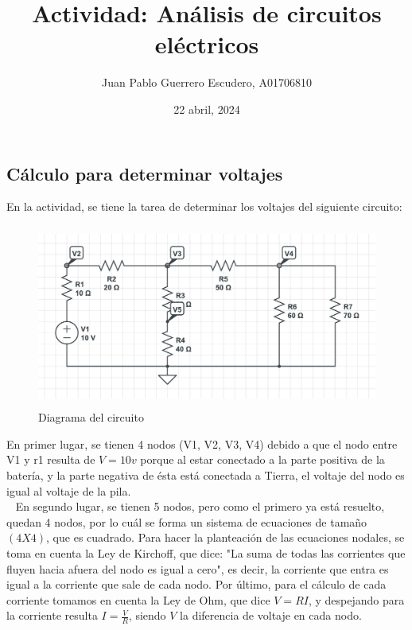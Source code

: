 \documentclass[12pt, letterpaper]{report}
\title{Actividad: Análisis de circuitos eléctricos}
\author{Juan Pablo Guerrero Escudero, A01706810}
\date{22 abril, 2024}
\begin{document}
\maketitle
\subsection*{Cálculo para determinar voltajes}
En la actividad, se tiene la tarea de determinar los voltajes del siguiente circuito: 
\begin{figure}[H]
    \centering
    \includegraphics[height = 6cm]{2024-04-22_DiagramaActividadCircuito.png}
    \caption{Diagrama del circuito}
\end{figure}
En primer lugar, se tienen 4 nodos (V1, V2, V3, V4) debido a que el nodo entre V1 y r1 resulta de $V = 10v$ porque 
al estar conectado a la parte positiva de la batería, y la parte negativa de ésta está conectada a Tierra, el voltaje del nodo 
es igual al voltaje de la pila. \\ 
En segundo lugar, se tienen 5 nodos, pero como el primero ya está resuelto, quedan 4 nodos, por lo cuál se forma un sistema de ecuaciones de tamaño 
$(4X4)$, que es cuadrado. Para hacer la planteación de las ecuaciones nodales, se toma en cuenta la Ley de Kirchoff, que dice: "La suma de todas las corrientes 
que fluyen hacia afuera del nodo es igual a cero", es decir, la corriente que entra es igual a la corriente que sale de cada nodo. Por último, para el cálculo de 
cada corriente tomamos en cuenta la Ley de Ohm, que dice $V = RI $, y despejando para la corriente resulta $I = \frac{V}{R}$, siendo $V$ la diferencia de voltaje en cada nodo. \\
\end{document}
